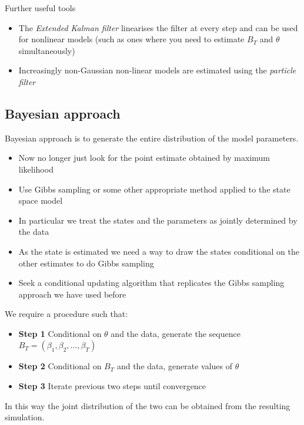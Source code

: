 \documentclass[
  letterpaper,
]{book}
\providecommand{\tightlist}{%
  \setlength{\itemsep}{0pt}\setlength{\parskip}{0pt}}\usepackage{longtable,booktabs,array}
\begin{document}
Further useful tools

\begin{itemize}
\tightlist
\item
  The \emph{Extended Kalman filter} linearises the filter at every step
  and can be used for nonlinear models (such as ones where you need to
  estimate \(B_T\) and \(\theta\) simultaneously)
\item
  Increasingly non-Gaussian non-linear models are estimated using the
  \emph{particle filter}
\end{itemize}

\hypertarget{bayesian-approach}{%
\subsection{Bayesian approach}\label{bayesian-approach}}

Bayesian approach is to generate the entire distribution of the model
parameters.

\begin{itemize}
\tightlist
\item
  Now no longer just look for the point estimate obtained by maximum
  likelihood
\item
  Use Gibbs sampling or some other appropriate method applied to the
  state space model
\item
  In particular we treat the states and the parameters as jointly
  determined by the data
\item
  As the state is estimated we need a way to draw the states conditional
  on the other estimates to do Gibbs sampling
\item
  Seek a conditional updating algorithm that replicates the Gibbs
  sampling approach we have used before
\end{itemize}

We require a procedure such that:

\begin{itemize}
\tightlist
\item
  \textbf{Step 1} Conditional on \(\theta\) and the data, generate the
  sequence \(B_T = (\beta_1, \beta_2, \ldots, \beta_T)\)
\item
  \textbf{Step 2} Conditional on \(B_T\) and the data, generate values
  of \(\theta\)
\item
  \textbf{Step 3} Iterate previous two steps until convergence
\end{itemize}

In this way the joint distribution of the two can be obtained from the
resulting simulation.
\end{document}
